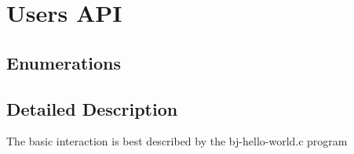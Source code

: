 \hypertarget{group__docgrp___a_p_i}{}\section{User\textquotesingle{}s A\+PI}
\label{group__docgrp___a_p_i}
\subsection*{Enumerations}


\subsection{Detailed Description}
The basic interaction is best described by the bj-\/hello-\/world.\+c program


